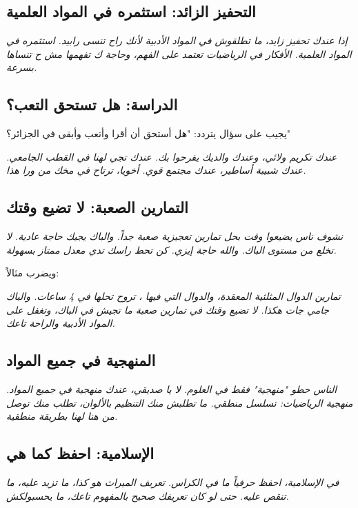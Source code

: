 \documentclass[12pt,a4paper]{book}
\newcommand{\quoteAr}[1]{%
	\begin{myquote}
		\itshape #1
	\end{myquote}
}
\begin{document}
	\subsection{التحفيز الزائد: استثمره في المواد العلمية}
	
	\quoteAr{إذا عندك تحفيز زايد، ما تطلقوش في المواد الأدبية لأنك راح تنسى رابيد. استثمره في المواد العلمية. الأفكار في الرياضيات تعتمد على الفهم، وحاجة ك تفهمها مش ح تنساها بسرعة.}
	
	\subsection{الدراسة: هل تستحق التعب؟}
	
	يجيب على سؤال يتردد: "هل أستحق أن أقرا وأتعب وأبقى في الجزائر؟"
	
	\quoteAr{عندك تكريم ولائي، وعندك والديك يفرحوا بك. عندك تجي لهنا في القطب الجامعي. عندك شبيبة أساطير، عندك مجتمع قوي. أخويا، ترتاح في مخك من ورا هذا.}
	
	\subsection{التمارين الصعبة: لا تضيع وقتك}
	
	\quoteAr{نشوف ناس يضيعوا وقت بحل تمارين تعجيزية صعبة جداً. والباك يجيك حاجة عادية. لا تخلع من مستوى الباك. والله حاجة إيزي. كن تحط راسك تدي معدل ممتاز بسهولة.}
	
	ويضرب مثالاً:
	
	\quoteAr{تمارين الدوال المثلثية المعقدة، والدوال التي فيها \LR{tan x}، تروح تحلها في 4 ساعات. والباك جامي جات هكذا. لا تضيع وقتك في تمارين صعبة ما تجيش في الباك، وتغفل على المواد الأدبية والراحة تاعك.}
	
	\subsection{المنهجية في جميع المواد}
	
	\quoteAr{الناس حطو "منهجية" فقط في العلوم. لا يا صديقي، عندك منهجية في جميع المواد. منهجية الرياضيات: تسلسل منطقي. ما تطلبش منك التنظيم بالألوان، تطلب منك توصل من هنا لهنا بطريقة منطقية.}
	
	\subsection{الإسلامية: احفظ كما هي}
	
	\quoteAr{في الإسلامية، احفظ حرفياً ما في الكراس. تعريف الميراث هو كذا، ما تزيد عليه، ما تنقص عليه. حتى لو كان تعريفك صحيح بالمفهوم تاعك، ما يحسبولكش.}
	
\end{document}
